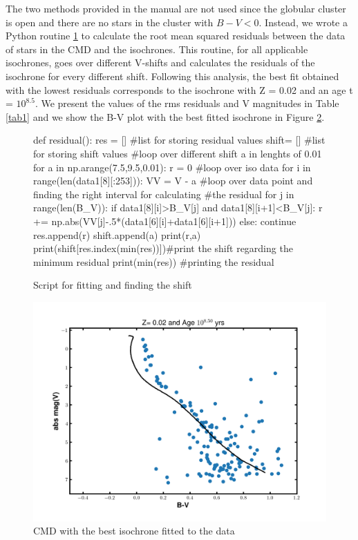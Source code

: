 \documentclass[12pt]{article}
\begin{document}
The two methods provided in the manual are not used since the globular cluster is open and there are no stars in the cluster with $B-V < 0$. Instead, we wrote a Python routine \ref{python} to calculate the root mean squared residuals between the data of stars in the CMD and the isochrones. This routine, for all applicable isochrones, goes over different V-shifts and calculates the residuals of the isochrone for every different shift. Following this analysis, the best fit obtained with the lowest residuals corresponds to the isochrone with Z = 0.02 and an age t = $10^{8.5}$. We present the values of the rms residuals and V magnitudes in Table \ref{tab1} and we show the B-V plot with the best fitted isochrone in Figure \ref{isochrone}. 

\begin{figure}
\begin{python}
def residual():
    res = [] #list for storing residual values
    shift= [] #list for storing shift values
    #loop over different shift a in lenghts of 0.01
    for a in np.arange(7.5,9.5,0.01):
        r = 0
        #loop over iso data  
        for i in range(len(data1[8][:253])): 
            VV = V - a
            #loop over data point and finding the right interval for calculating
            #the residual
            for j in range(len(B_V)):
                if data1[8][i]>B_V[j] and data1[8][i+1]<B_V[j]:
                    r += np.abs(VV[j]-.5*(data1[6][i]+data1[6][i+1]))
                else:
                    continue
        res.append(r)
        shift.append(a)
        print(r,a)
    print(shift[res.index(min(res))])#print the shift regarding the minimum residual 
    print(min(res)) #printing the residual
\end{python}
\caption{Script for fitting and finding the shift}
\label{python}
\end{figure}

\begin{figure}[H]
    \centering
    \includegraphics[width=\textwidth]{fig/iso_z020_850.png}
    \caption{CMD with the best isochrone fitted to the data}
    \label{isochrone}
\end{figure}
\end{document}
